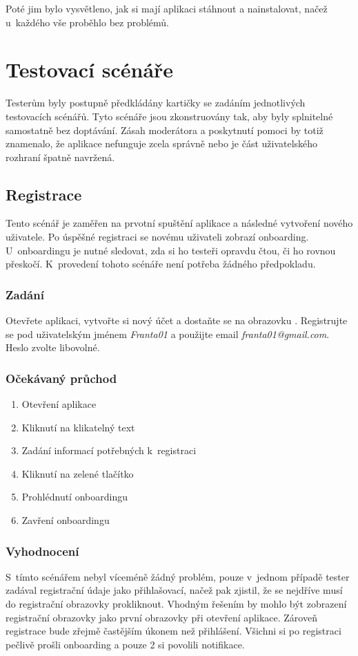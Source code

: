 \documentclass[thesis=M,czech]{FITthesis}[2019/12/23]
\begin{document}
Poté jim bylo vysvětleno, jak si mají aplikaci stáhnout a nainstalovat, načež u~každého vše proběhlo bez problémů.

\section{Testovací scénáře}
Testerům byly postupně předkládány kartičky se zadáním jednotlivých testovacích scénářů. Tyto scénáře jsou zkonstruovány tak, aby byly splnitelné samostatně bez doptávání. Zásah moderátora a poskytnutí pomoci by totiž znamenalo, že aplikace nefunguje zcela správně nebo je část uživatelského rozhraní špatně navržená.

\subsection{Registrace}
Tento scénář je zaměřen na prvotní spuštění aplikace a následné vytvoření nového uživatele. Po úspěšné registraci se novému uživateli zobrazí onboarding. U~onboardingu je nutné sledovat, zda si ho testeři opravdu čtou, či ho rovnou přeskočí. K~provedení tohoto scénáře není potřeba žádného předpokladu.
\subsubsection*{Zadání}
Otevřete aplikaci, vytvořte si nový účet a dostaňte se na obrazovku . Registrujte se pod uživatelským jménem \textit{Franta01} a použijte email \textit{franta01@gmail.com}. Heslo zvolte libovolné.
\subsubsection*{Očekávaný průchod}
\begin{enumerate}
    \item Otevření aplikace
    \item Kliknutí na klikatelný text 
    \item Zadání informací potřebných k~registraci
    \item Kliknutí na zelené tlačítko 
    \item Prohlédnutí onboardingu
    \item Zavření onboardingu
\end{enumerate}
\subsubsection*{Vyhodnocení}
S~tímto scénářem nebyl víceméně žádný problém, pouze v~jednom případě tester zadával registrační údaje jako přihlašovací, načež pak zjistil, že se nejdříve musí do registrační obrazovky prokliknout. Vhodným řešením by mohlo být zobrazení registrační obrazovky jako první obrazovky při otevření aplikace. Zároveň registrace bude zřejmě častějším úkonem než přihlášení. Všichni si po registraci pečlivě prošli onboarding a pouze 2 si povolili notifikace.
\end{document}
